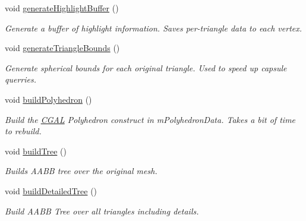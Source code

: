 \begin{DoxyCompactItemize}
\mbox{\label{classpepr3d_1_1_geometry_a36740d72ad8b50c81f39ad506fa0281e}} 
void \mbox{\hyperlink{classpepr3d_1_1_geometry_a36740d72ad8b50c81f39ad506fa0281e}{generate\+Highlight\+Buffer}} ()
\begin{DoxyCompactList}\small\item\em Generate a buffer of highlight information. Saves per-\/triangle data to each vertex. \end{DoxyCompactList}\item 
\mbox{\label{classpepr3d_1_1_geometry_a1f4435ad35840859cbb4dd949af46845}} 
void \mbox{\hyperlink{classpepr3d_1_1_geometry_a1f4435ad35840859cbb4dd949af46845}{generate\+Triangle\+Bounds}} ()
\begin{DoxyCompactList}\small\item\em Generate spherical bounds for each original triangle. Used to speed up capsule querries. \end{DoxyCompactList}\item 
\mbox{\label{classpepr3d_1_1_geometry_a9ffaaaa3702f7505206f4e45aebfd4a9}} 
void \mbox{\hyperlink{classpepr3d_1_1_geometry_a9ffaaaa3702f7505206f4e45aebfd4a9}{build\+Polyhedron}} ()
\begin{DoxyCompactList}\small\item\em Build the \mbox{\hyperlink{namespace_c_g_a_l}{C\+G\+AL}} Polyhedron construct in m\+Polyhedron\+Data. Takes a bit of time to rebuild. \end{DoxyCompactList}\item 
\mbox{\label{classpepr3d_1_1_geometry_aff6b12b0be4f64925e3a9aa88b85bb09}} 
void \mbox{\hyperlink{classpepr3d_1_1_geometry_aff6b12b0be4f64925e3a9aa88b85bb09}{build\+Tree}} ()
\begin{DoxyCompactList}\small\item\em Builds A\+A\+BB tree over the original mesh. \end{DoxyCompactList}\item 
\mbox{\label{classpepr3d_1_1_geometry_a11091a0db475dc20b6635f17afb07b23}} 
void \mbox{\hyperlink{classpepr3d_1_1_geometry_a11091a0db475dc20b6635f17afb07b23}{build\+Detailed\+Tree}} ()
\begin{DoxyCompactList}\small\item\em Build A\+A\+BB Tree over all triangles including details. \end{DoxyCompactList}\item 

\end{DoxyCompactItemize}

